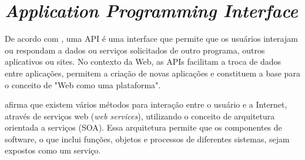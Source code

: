 \chapter{\textit{Application Programming Interface}}

De acordo com , uma API é uma interface que permite que os 
usuários interajam ou respondam a dados ou serviços solicitados de outro programa, outros
aplicativos ou sites. No contexto da Web, as APIs facilitam a troca de dados entre 
aplicações, permitem a criação de novas aplicações e constituem a base para o conceito de 
"Web como uma plataforma". 

 afirma que existem vários métodos para interação entre o  
usuário e a Internet, através de serviços web (\textit{web services}), utilizando o conceito 
de arquitetura orientada a serviços (SOA). Essa arquitetura permite que os componentes de 
software, o que inclui funções, objetos e processos de diferentes sistemas, sejam expostos 
como um serviço.





